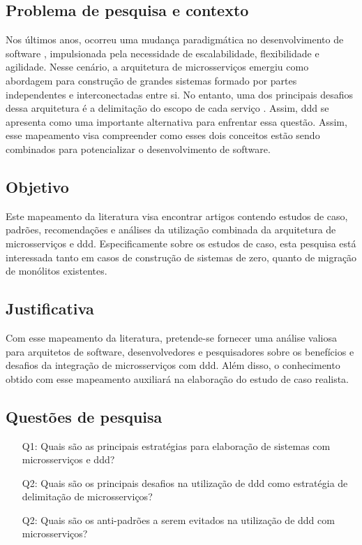 \subsection{Problema de pesquisa e contexto}
Nos últimos anos, ocorreu uma mudança paradigmática no desenvolvimento de software \cite{microserviceAdoption}, impulsionada pela necessidade de escalabilidade, flexibilidade e agilidade. Nesse cenário, a arquitetura de microsserviços emergiu como abordagem para construção de grandes sistemas formado por partes independentes e interconectadas entre si. No entanto, uma dos principais desafios dessa arquitetura é a delimitação do escopo de cada serviço \cite{richardson2018microservices}. Assim, \acrfull{ddd} se apresenta como uma importante alternativa para enfrentar essa questão. Assim, esse mapeamento visa compreender como esses dois conceitos estão sendo combinados para potencializar o desenvolvimento de software.

\subsection{Objetivo}
Este mapeamento da literatura visa encontrar artigos contendo estudos de caso, padrões, recomendações e análises da utilização combinada da arquitetura de microsserviços e \acrshort{ddd}. Especificamente sobre os estudos de caso, esta pesquisa está interessada tanto em casos de construção de sistemas de zero, quanto de migração de monólitos existentes. 

\subsection{Justificativa}
Com esse mapeamento da literatura, pretende-se fornecer uma análise valiosa para arquitetos de software, desenvolvedores e pesquisadores sobre os benefícios e desafios da integração de microsserviços com \acrshort{ddd}. Além disso, o conhecimento obtido com esse mapeamento auxiliará na elaboração do estudo de caso realista.

\subsection{Questões de pesquisa}
\label{section:questoes_pesquisa}
\begin{enumerate}
    \item[Q1:] Quais são as principais estratégias para elaboração de sistemas com microsserviços e \acrshort{ddd}?
    \item[Q2:] Quais são os principais desafios na utilização de \acrshort{ddd} como estratégia de delimitação de microsserviços?
    \item[Q2:] Quais são os anti-padrões a serem evitados na utilização de \acrshort{ddd} com microsserviços?
    
\end{enumerate}

